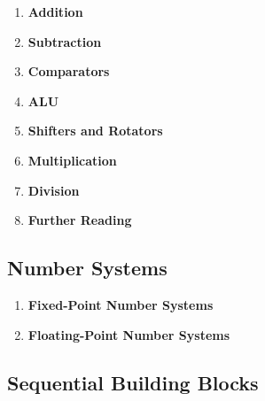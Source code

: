 \documentclass[12pt]{article}
\begin{document}
\begin{enumerate}
  \item \textbf{Addition}

  \item \textbf{Subtraction}

  \item \textbf{Comparators}

  \item \textbf{ALU}

  \item \textbf{Shifters and Rotators}

  \item \textbf{Multiplication}

  \item \textbf{Division}

  \item \textbf{Further Reading}
\end{enumerate}

\subsection{Number Systems}

\begin{enumerate}
  \item \textbf{Fixed-Point Number Systems}

  \item \textbf{Floating-Point Number Systems}
\end{enumerate}

\subsection{Sequential Building Blocks}
\end{document}
